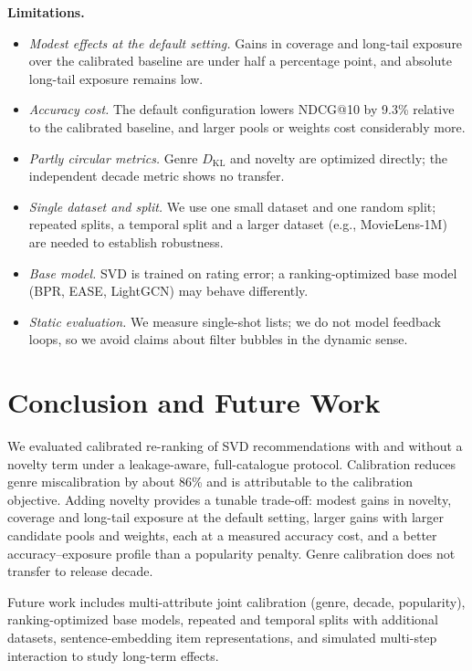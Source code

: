 \documentclass[conference]{IEEEtran}
\newcommand{\KL}{D_{\mathrm{KL}}}
\begin{document}
  \textbf{Limitations.}
  \begin{itemize}
    \item \emph{Modest effects at the default setting.} Gains in coverage and long-tail exposure over the calibrated baseline are under half a percentage point, and absolute long-tail exposure remains low.
    \item \emph{Accuracy cost.} The default configuration lowers NDCG@10 by 9.3\% relative to the calibrated baseline, and larger pools or weights cost considerably more.
    \item \emph{Partly circular metrics.} Genre $\KL$ and novelty are optimized directly; the independent decade metric shows no transfer.
    \item \emph{Single dataset and split.} We use one small dataset and one random split; repeated splits, a temporal split and a larger dataset (e.g., MovieLens-1M) are needed to establish robustness.
    \item \emph{Base model.} SVD is trained on rating error; a ranking-optimized base model (BPR, EASE, LightGCN) may behave differently.
    \item \emph{Static evaluation.} We measure single-shot lists; we do not model feedback loops, so we avoid claims about filter bubbles in the dynamic sense.
  \end{itemize}

  \section{Conclusion and Future Work}\label{sec:conc}
  We evaluated calibrated re-ranking of SVD recommendations with and without a novelty term under a leakage-aware, full-catalogue protocol. Calibration reduces genre miscalibration by about 86\% and is attributable to the calibration objective. Adding novelty provides a tunable trade-off: modest gains in novelty, coverage and long-tail exposure at the default setting, larger gains with larger candidate pools and weights, each at a measured accuracy cost, and a better accuracy--exposure profile than a popularity penalty. Genre calibration does not transfer to release decade.

  Future work includes multi-attribute joint calibration (genre, decade, popularity), ranking-optimized base models, repeated and temporal splits with additional datasets, sentence-embedding item representations, and simulated multi-step interaction to study long-term effects.
\end{document}
